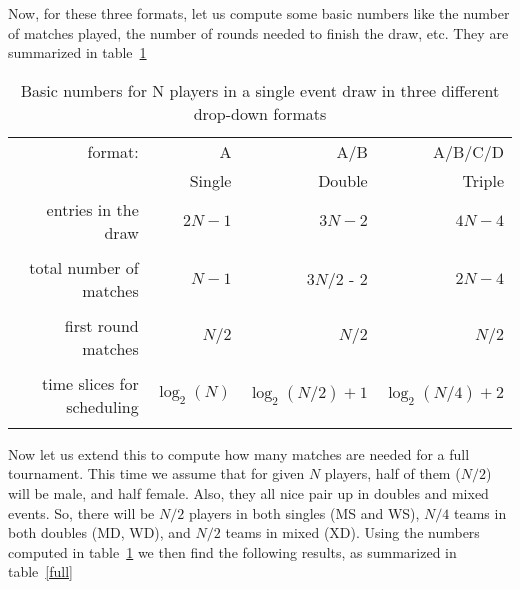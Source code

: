 Now, for these three formats, let us compute some basic numbers
like the number of matches played, the number of rounds needed
to finish the draw, etc. They are summarized in table~\ref{basic}

\newpage

\begin{table}[h]
\begin{center}
\begin{tabular}{|r||r|r|r|}
\hline
format:           &       A                 &         A/B     &   A/B/C/D \\
                   & Single                 &  Double          & Triple  \\
\hline

entries in the draw & $2N-1$            &      $ 3N-2$        &  $ 4N-4 $    \\

&&&\\

total number of matches        & $N-1$                &    ${ 3N/2}$ - 2 &  $2N-4 $ \\

&&&\\

first round matches & $N/2$             &  $N/2$ & $N/2$ \\

&&&\\

time slices for scheduling  & $\log_2(N)$  & 
                $\log_2{( {N/2} )} + 1$  & 
                $\log_2{( {N/4} )} + 2$  \\

&&&\\

\hline

\end{tabular}
\caption{Basic numbers for N players in a single event draw 
in three different drop-down formats}
\label{basic}
\end{center}
\end{table}

Now let us extend this to compute how many matches are needed for
a full tournament. This time we assume that for given $N$ players,
half of them ($N/2$) will be male, and half female. Also, they all
nice pair up in doubles and mixed events. So, there will be
$N/2$ players in both singles (MS and WS), 
$N/4$ teams in both doubles (MD, WD), and 
$N/2$ teams in mixed (XD). Using the numbers computed in table~\ref{basic}
we then find the following results, as summarized in 
table~\ref{full}

